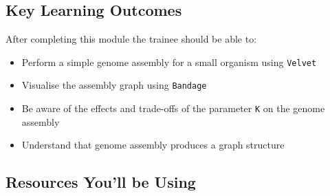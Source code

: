 
\chapter{\moduleTitle}
\newpage


\section{Key Learning Outcomes}

After completing this module the trainee should be able to:
\begin{itemize}
  \item Perform a simple genome assembly for a small organism using \texttt{Velvet}
  \item Visualise the assembly graph using \texttt{Bandage}
  \item Be aware of the effects and trade-offs of the parameter \texttt{K} on the genome assembly
  \item Understand that genome assembly produces a graph structure
\end{itemize}

\section{Resources You'll be Using}
 
